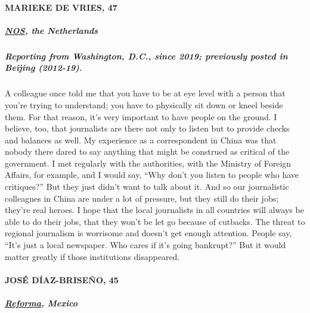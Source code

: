 \hypertarget{marieke-de-vries-47}{%
\paragraph{MARIEKE DE VRIES, 47}\label{marieke-de-vries-47}}

\hypertarget{nos-the-netherlands}{%
\subparagraph{\texorpdfstring{\textbf{\href{https://over.nos.nl/onze-mensen/147/marieke-de-vries}{NOS},
the Netherlands}}{NOS, the Netherlands}}\label{nos-the-netherlands}}

\hypertarget{reporting-from-washington-dc-since-2019-previously-posted-in-beijing-2012-19}{%
\subparagraph{\texorpdfstring{\textbf{Reporting from Washington, D.C.,
since 2019; previously posted in Beijing
(2012-19).}}{Reporting from Washington, D.C., since 2019; previously posted in Beijing (2012-19).}}\label{reporting-from-washington-dc-since-2019-previously-posted-in-beijing-2012-19}}

A colleague once told me that you have to be at eye level with a person
that you're trying to understand; you have to physically sit down or
kneel beside them. For that reason, it's very important to have people
on the ground. I believe, too, that journalists are there not only to
listen but to provide checks and balances as well. My experience as a
correspondent in China was that nobody there dared to say anything that
might be construed as critical of the government. I met regularly with
the authorities, with the Ministry of Foreign Affairs, for example, and
I would say, ``Why don't you listen to people who have critiques?'' But
they just didn't want to talk about it. And so our journalistic
colleagues in China are under a lot of pressure, but they still do their
jobs; they're real heroes. I hope that the local journalists in all
countries will always be able to do their jobs, that they won't be let
go because of cutbacks. The threat to regional journalism is worrisome
and doesn't get enough attention. People say, ``It's just a local
newspaper. Who cares if it's going bankrupt?'' But it would matter
greatly if those institutions disappeared.

\hypertarget{josuxe9-duxedaz-briseuxf1o-45}{%
\paragraph{JOSÉ DÍAZ-BRISEÑO, 45}\label{josuxe9-duxedaz-briseuxf1o-45}}

\hypertarget{reforma-mexico}{%
\subparagraph{\texorpdfstring{\textbf{\href{https://www.reforma.com/}{Reforma},
Mexico}}{Reforma, Mexico}}\label{reforma-mexico}}

